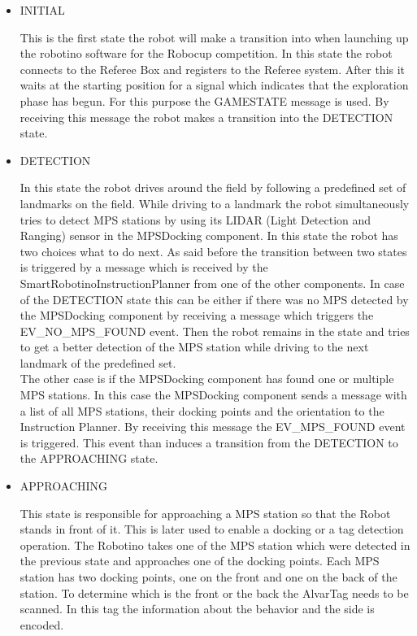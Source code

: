 \begin{itemize}

\item INITIAL 

This is the first state the robot will make a transition into when launching up the robotino software for the Robocup competition. In this state the robot connects to the Referee Box and registers to the Referee system. After this it waits at the starting position for a signal which indicates that the exploration phase has begun. For this purpose the GAMESTATE message is used. By receiving this message the robot makes a transition into the DETECTION state.   


\item DETECTION

In this state the robot drives around the field by following a predefined set of landmarks on the field. While driving to a landmark the robot simultaneously tries to detect MPS stations by using its LIDAR (Light Detection and Ranging) sensor in the MPSDocking component. In this state the robot has two choices what to do next. As said before the transition between two states is triggered by a message which is received by the SmartRobotinoInstructionPlanner from one of the other components. In case of the DETECTION state this can be either if there was no MPS detected by the MPSDocking component by receiving a message which triggers the EV\_NO\_MPS\_FOUND event. Then the robot remains in the state and tries to get a better detection of the MPS station while driving to the next landmark of the predefined set.  \\

The other case is if the MPSDocking component has found one or multiple MPS stations. In this case the MPSDocking component sends a message with a list of all MPS stations, their docking points and the orientation to the Instruction Planner. By receiving this message the EV\_MPS\_FOUND event is triggered. This event than induces a transition from the DETECTION to the APPROACHING state. 

\item APPROACHING 

This state is responsible for approaching a MPS station so that the Robot stands in front of it. This is later used to enable a docking or a tag detection operation. The Robotino takes one of the MPS station which were detected in the previous state and approaches one of the docking points. Each MPS station has two docking points, one on the front and one on the back of the station. To determine which is the front or the back the AlvarTag needs to be scanned. In this tag the information about the behavior and the side is encoded. \\


\end{itemize}
